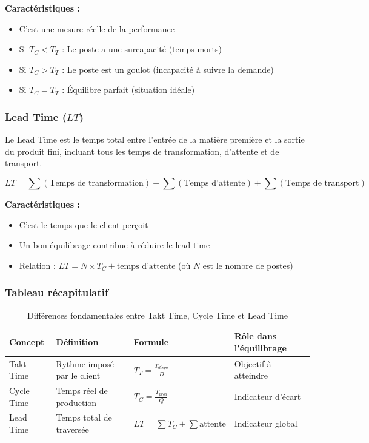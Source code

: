 \documentclass[12pt,a4paper]{article}
\begin{document}
\textbf{Caractéristiques :}
\begin{itemize}
    \item C'est une mesure réelle de la performance
    \item Si $T_C < T_T$ : Le poste a une surcapacité (temps morts)
    \item Si $T_C > T_T$ : Le poste est un goulot (incapacité à suivre la demande)
    \item Si $T_C = T_T$ : Équilibre parfait (situation idéale)
\end{itemize}

\subsubsection{Lead Time ($LT$)}

Le Lead Time est le temps total entre l'entrée de la matière première et la sortie du produit fini, incluant tous les temps de transformation, d'attente et de transport.

\[
\boxed{LT = \sum (\text{Temps de transformation}) + \sum (\text{Temps d'attente}) + \sum (\text{Temps de transport})}
\]

\textbf{Caractéristiques :}
\begin{itemize}
    \item C'est le temps que le client perçoit
    \item Un bon équilibrage contribue à réduire le lead time
    \item Relation : $LT = N \times T_C + \text{temps d'attente}$ (où $N$ est le nombre de postes)
\end{itemize}

\subsubsection{Tableau récapitulatif}

\begin{table}[H]
\centering
\begin{tabular}{|p{2.5cm}|p{3.5cm}|p{3.5cm}|p{4cm}|}
\hline
\textbf{Concept} & \textbf{Définition} & \textbf{Formule} & \textbf{Rôle dans l'équilibrage} \\
\hline
Takt Time & Rythme imposé par le client & $T_T = \frac{T_{dispo}}{D}$ & Objectif à atteindre \\
\hline
Cycle Time & Temps réel de production & $T_C = \frac{T_{prod}}{Q}$ & Indicateur d'écart \\
\hline
Lead Time & Temps total de traversée & $LT = \sum T_C + \sum \text{attente}$ & Indicateur global \\
\hline
\end{tabular}
\caption{Différences fondamentales entre Takt Time, Cycle Time et Lead Time}
\end{table}
\end{document}
